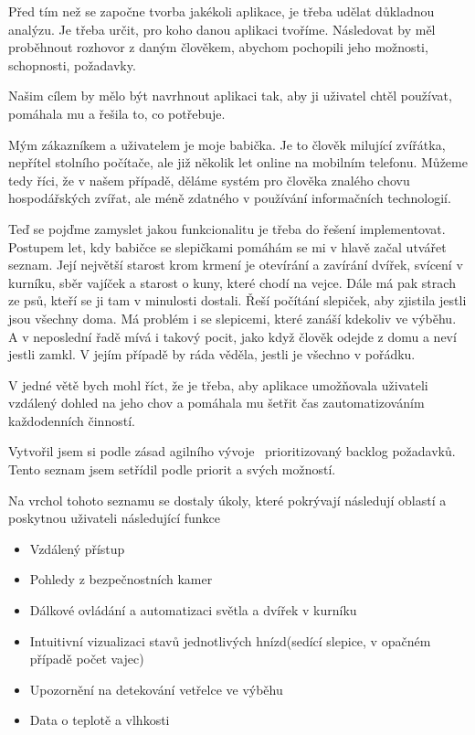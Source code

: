 Před tím než se započne tvorba jakékoli aplikace, je třeba udělat důkladnou analýzu.
Je třeba určit, pro koho danou aplikaci tvoříme.
Následovat by měl proběhnout rozhovor z daným člověkem, abychom pochopili jeho možnosti, schopnosti, požadavky.

Našim cílem by mělo být navrhnout aplikaci tak, aby ji uživatel chtěl používat, pomáhala mu a řešila to, co potřebuje.

Mým zákazníkem a uživatelem je moje babička.
Je to člověk milující zvířátka, nepřítel stolního počítače, ale již několik let online na mobilním telefonu.
Můžeme tedy říci, že v našem případě, děláme systém pro člověka znalého chovu hospodářských zvířat, ale méně zdatného v používání informačních technologií.

Teď se pojďme zamyslet jakou funkcionalitu je třeba do řešení implementovat.
Postupem let, kdy babičce se slepičkami pomáhám se mi v hlavě začal utvářet seznam.
Její největší starost krom krmení je otevírání a zavírání dvířek, svícení v kurníku, sběr vajíček a starost o kuny, které chodí na vejce.
Dále má pak strach ze psů, kteří se ji tam v minulosti dostali.
Řeší počítání slepiček, aby zjistila jestli jsou všechny doma.
Má problém i se slepicemi, které zanáší kdekoliv ve výběhu.
A v neposlední řadě mívá i takový pocit, jako když člověk odejde z domu a neví jestli zamkl.
V jejím případě by ráda věděla, jestli je všechno v pořádku.

V jedné větě bych mohl říct, že je třeba, aby aplikace umožňovala uživateli vzdálený dohled na jeho chov a pomáhala mu šetřit čas zautomatizováním každodenních činností.

Vytvořil jsem si podle zásad agilního vývoje~\cite{agile-manifesto} prioritizovaný backlog požadavků.
Tento seznam jsem setřídil podle priorit a svých možností.

Na vrchol tohoto seznamu se dostaly úkoly, které pokrývají následují oblastí a poskytnou uživateli následující funkce

\begin{itemize}
    \item Vzdálený přístup
    \item Pohledy z bezpečnostních kamer
    \item Dálkové ovládání a automatizaci světla a dvířek v kurníku
    \item Intuitivní vizualizaci stavů jednotlivých hnízd(sedící slepice, v opačném případě počet vajec)
    \item Upozornění na detekování vetřelce ve výběhu
    \item Data o teplotě a vlhkosti
\end{itemize}


\newpage